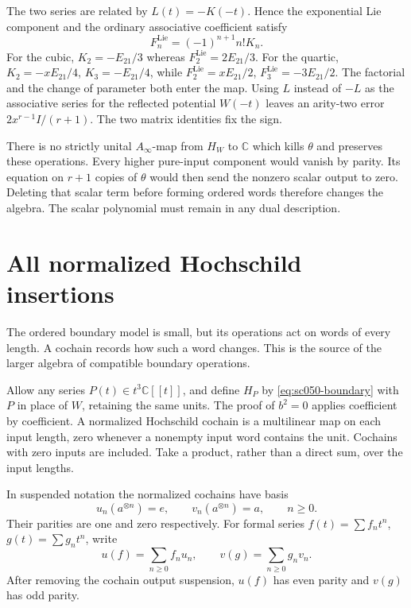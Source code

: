 The two series are related by \(L(t)=-K(-t)\). Hence the
exponential Lie component and the ordinary associative
coefficient satisfy
\begin{equation}\label{eq:sc050-sign-comparison}
 F_n^{\mathrm{Lie}}=(-1)^{n+1}n!K_n.
\end{equation}
For the cubic, \(K_2=-E_{21}/3\) whereas \(F_2^{\mathrm{Lie}}=2E_{21}/3\).
For the quartic, \(K_2=-xE_{21}/4\), \(K_3=-E_{21}/4\), while
\(F_2^{\mathrm{Lie}}=xE_{21}/2\), \(F_3^{\mathrm{Lie}}=-3E_{21}/2\).
The factorial and the change of parameter both enter the map.
Using \(L\) instead of \(-L\) as the associative series for
the reflected potential \(W(-t)\) leaves an arity-two error
\(2x^{r-1}I/(r+1)\). The two matrix identities fix the sign.

There is no strictly unital \(A_\infty\)-map from \(H_W\) to
\(\mathbb C\) which kills \(\theta\) and preserves these operations.
Every higher pure-input component would vanish by parity. Its
equation on \(r+1\) copies of \(\theta\) would then send the
nonzero scalar output to zero. Deleting that scalar term before
forming ordered words therefore changes the algebra. The
scalar polynomial must remain in any dual description.

\section{All normalized Hochschild insertions}
\label{sec:sc050-hochschild}

The ordered boundary model is small, but its operations act on
words of every length. A cochain records how such a word changes.
This is the source of the larger algebra of compatible boundary
operations.

Allow any series \(P(t)\in t^3\mathbb C[[t]]\), and define \(H_P\)
by \eqref{eq:sc050-boundary} with \(P\) in place of \(W\), retaining
the same units. The proof of \(b^2=0\) applies coefficient by
coefficient. A normalized Hochschild cochain is a multilinear
map on each input length, zero whenever a nonempty input word
contains the unit. Cochains with zero inputs are included.
Take a product, rather than a direct sum, over the input lengths.

In suspended notation the normalized cochains have basis
\[
 u_n(a^{\otimes n})=e,\qquad v_n(a^{\otimes n})=a,\qquad n\ge0.
\]
Their parities are one and zero respectively. For formal series
\(f(t)=\sum f_nt^n\), \(g(t)=\sum g_nt^n\), write
\[
 u(f)=\sum_{n\ge0}f_nu_n,\qquad
 v(g)=\sum_{n\ge0}g_nv_n.
\]
After removing the cochain output suspension, \(u(f)\) has even
parity and \(v(g)\) has odd parity.

